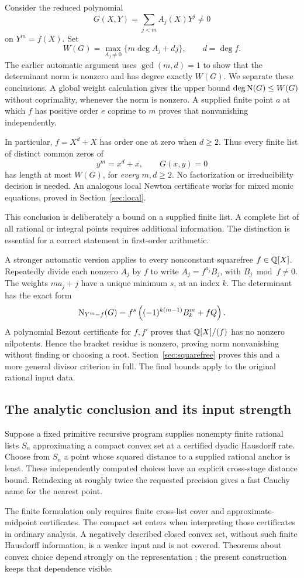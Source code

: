 Consider the reduced polynomial
\[
 G(X,Y)=\sum_{j<m}A_j(X)Y^j\ne0
\]
on $Y^m=f(X)$. Set
\[
 W(G)=\max_{A_j\ne0}\{m\deg A_j+d j\},\qquad d=\deg f.
\]
The earlier automatic argument uses $\gcd(m,d)=1$ to show that the determinant norm is nonzero and has degree exactly $W(G)$. We separate these conclusions. A global weight calculation gives the upper bound $\deg\operatorname{N}(G)\le W(G)$ without coprimality, whenever the norm is nonzero. A supplied finite point $a$ at which $f$ has positive order $e$ coprime to $m$ proves that nonvanishing independently.

In particular, $f=X^d+X$ has order one at zero when $d\ge2$. Thus every finite list of distinct common zeros of
\[
 y^m=x^d+x,\qquad G(x,y)=0
\]
has length at most $W(G)$, for \emph{every} $m,d\ge2$. No factorization or irreducibility decision is needed. An analogous local Newton certificate works for mixed monic equations, proved in Section~\ref{sec:local}.

This conclusion is deliberately a bound on a supplied finite list. A complete list of all rational or integral points requires additional information. The distinction is essential for a correct statement in first-order arithmetic.

A stronger automatic version applies to every nonconstant squarefree $f\in\mathbb Q[X]$. Repeatedly divide each nonzero $A_j$ by $f$ to write $A_j=f^{a_j}B_j$, with $B_j\bmod f\ne0$. The weights $ma_j+j$ have a unique minimum $s$, at an index $k$. The determinant has the exact form
\[
 \operatorname{N}_{Y^m-f}(G)=f^s\left((-1)^{k(m-1)}B_k^m+fQ\right).
\]
A polynomial Bezout certificate for $f,f'$ proves that $\mathbb Q[X]/(f)$ has no nonzero nilpotents. Hence the bracket residue is nonzero, proving norm nonvanishing without finding or choosing a root. Section~\ref{sec:squarefree} proves this and a more general divisor criterion in full. The final bounds apply to the original rational input data.

\subsection{The analytic conclusion and its input strength}

Suppose a fixed primitive recursive program supplies nonempty finite rational lists $S_n$ approximating a compact convex set at a certified dyadic Hausdorff rate. Choose from $S_n$ a point whose squared distance to a supplied rational anchor is least. These independently computed choices have an explicit cross-stage distance bound. Reindexing at roughly twice the requested precision gives a fast Cauchy name for the nearest point.

The finite formulation only requires finite cross-list cover and approximate-midpoint certificates. The compact set enters when interpreting those certificates in ordinary analysis. A negatively described closed convex set, without such finite Hausdorff information, is a weaker input and is not covered. Theorems about convex choice depend strongly on the representation \cite{leroux-pauly}; the present construction keeps that dependence visible.
